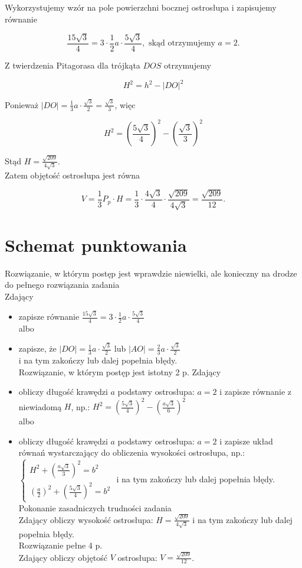 \documentclass[10pt]{article}
\begin{document}
Wykorzystujemy wzór na pole powierzchni bocznej ostrosłupa i zapisujemy równanie

$$
\frac{15 \sqrt{3}}{4}=3 \cdot \frac{1}{2} a \cdot \frac{5 \sqrt{3}}{4}, \text { skąd otrzymujemy } a=2 .
$$

Z twierdzenia Pitagorasa dla trójkąta $D O S$ otrzymujemy

$$
H^{2}=h^{2}-|D O|^{2}
$$

Ponieważ $|D O|=\frac{1}{3} a \cdot \frac{\sqrt{3}}{2}=\frac{\sqrt{3}}{3}$, więc

$$
H^{2}=\left(\frac{5 \sqrt{3}}{4}\right)^{2}-\left(\frac{\sqrt{3}}{3}\right)^{2}
$$

Stąd $H=\frac{\sqrt{209}}{4 \sqrt{3}}$.\\
Zatem objętość ostrosłupa jest równa

$$
V=\frac{1}{3} P_{p} \cdot H=\frac{1}{3} \cdot \frac{4 \sqrt{3}}{4} \cdot \frac{\sqrt{209}}{4 \sqrt{3}}=\frac{\sqrt{209}}{12} .
$$

\section*{Schemat punktowania}
Rozwiązanie, w którym postęp jest wprawdzie niewielki, ale konieczny na drodze do pełnego rozwiązania zadania\\
Zdający

\begin{itemize}
  \item zapisze równanie $\frac{15 \sqrt{3}}{4}=3 \cdot \frac{1}{2} a \cdot \frac{5 \sqrt{3}}{4}$\\
albo
  \item zapisze, że $|D O|=\frac{1}{3} a \cdot \frac{\sqrt{3}}{2}$ lub $|A O|=\frac{2}{3} a \cdot \frac{\sqrt{3}}{2}$\\
i na tym zakończy lub dalej popełnia błędy.\\
Rozwiązanie, w którym postęp jest istotny 2 p. Zdający
  \item obliczy długość krawędzi $a$ podstawy ostrosłupa: $a=2$ i zapisze równanie z niewiadomą $H$, np.: $H^{2}=\left(\frac{5 \sqrt{3}}{4}\right)^{2}-\left(\frac{a \sqrt{3}}{6}\right)^{2}$\\
albo
  \item obliczy długość krawędzi $a$ podstawy ostrosłupa: $a=2$ i zapisze układ równań wystarczający do obliczenia wysokości ostrosłupa, np.: $\left\{\begin{array}{l}H^{2}+\left(\frac{a \sqrt{3}}{3}\right)^{2}=b^{2} \\ \left(\frac{a}{2}\right)^{2}+\left(\frac{5 \sqrt{3}}{4}\right)^{2}=b^{2}\end{array}\right.$ i na tym zakończy lub dalej popełnia błędy.\\
Pokonanie zasadniczych trudności zadania\\
Zdający obliczy wysokość ostrosłupa: $H=\frac{\sqrt{209}}{4 \sqrt{3}}$ i na tym zakończy lub dalej popełnia błędy.\\
Rozwiązanie pełne 4 p.\\
Zdający obliczy objętość $V$ ostrosłupa: $V=\frac{\sqrt{209}}{12}$.
\end{itemize}
\end{document}
